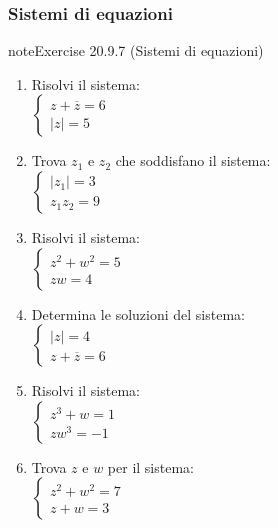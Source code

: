 \documentclass[letterpaper,10pt,italian]{jupyterBook}
\begin{document}
\subsubsection{Sistemi di equazioni}
\label{\detokenize{ch/algebra/complex-algebra-problems:sistemi-di-equazioni}}\label{\detokenize{ch/algebra/complex-algebra-problems:math-hs-algebra-complex-problems-equations-sys}} \label{exercise:ch/algebra/complex-algebra-problems-exercise-6}

\begin{sphinxadmonition}{note}{Exercise 20.9.7 (Sistemi di equazioni)}


\begin{enumerate}
%
\item {} 
\sphinxAtStartPar
Risolvi il sistema:\\
\(\begin{cases} 
z + \overline{z} = 6 \\
|z| = 5 
\end{cases}\)

\item {} 
\sphinxAtStartPar
Trova \(z_1\) e \(z_2\) che soddisfano il sistema:\\
\(\begin{cases} 
|z_1| = 3 \\
z_1 z_2 = 9 
\end{cases}\)

\item {} 
\sphinxAtStartPar
Risolvi il sistema:\\
\(\begin{cases} 
z^2 + w^2 = 5 \\
z w = 4 
\end{cases}\)

\item {} 
\sphinxAtStartPar
Determina le soluzioni del sistema:\\
\(\begin{cases} 
|z| = 4 \\
z + \overline{z} = 6 
\end{cases}\)

\item {} 
\sphinxAtStartPar
Risolvi il sistema:\\
\(\begin{cases} 
z^3 + w = 1 \\
z w^3 = -1 
\end{cases}\)

\item {} 
\sphinxAtStartPar
Trova \(z\) e \(w\) per il sistema:\\
\(\begin{cases} 
z^2 + w^2 = 7 \\
z + w = 3 
\end{cases}\)


\end{enumerate}
\end{sphinxadmonition}
\end{document}

